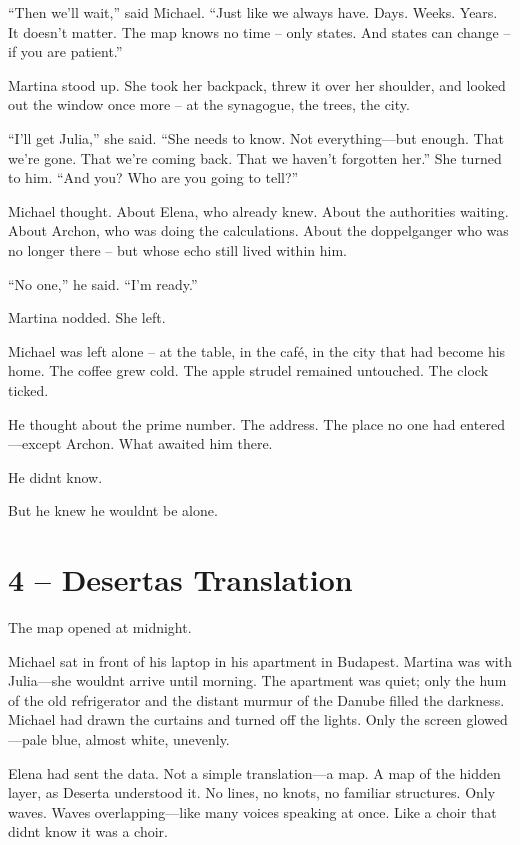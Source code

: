 \documentclass[
]{article}
\begin{document}
``Then we'll wait,'' said Michael. ``Just like we always have. Days. Weeks. Years. It doesn't matter. The map knows no time -- only states. And states can change -- if you are patient.''

Martina stood up. She took her backpack, threw it over her shoulder, and looked out the window once more -- at the synagogue, the trees, the city.

``I'll get Julia,'' she said. ``She needs to know. Not everything---but enough. That we're gone. That we're coming back. That we haven't forgotten her.'' She turned to him. ``And you? Who are you going to tell?''

Michael thought. About Elena, who already knew. About the authorities waiting. About Archon, who was doing the calculations. About the doppelganger who was no longer there -- but whose echo still lived within him.

``No one,'' he said. ``I'm ready.''

Martina nodded. She left.

Michael was left alone -- at the table, in the café, in the city that had become his home. The coffee grew cold. The apple strudel remained untouched. The clock ticked.

He thought about the prime number. The address. The place no one had entered---except Archon. What awaited him there.

He didn\textquotesingle t know.

But he knew he wouldn\textquotesingle t be alone.

\section{4 -- Desertas Translation}\label{desertas-translation}

The map opened at midnight.

Michael sat in front of his laptop in his apartment in Budapest. Martina was with Julia---she wouldn\textquotesingle t arrive until morning. The apartment was quiet; only the hum of the old refrigerator and the distant murmur of the Danube filled the darkness. Michael had drawn the curtains and turned off the lights. Only the screen glowed---pale blue, almost white, unevenly.

Elena had sent the data. Not a simple translation---a map. A map of the hidden layer, as Deserta understood it. No lines, no knots, no familiar structures. Only waves. Waves overlapping---like many voices speaking at once. Like a choir that didn\textquotesingle t know it was a choir.
\end{document}
